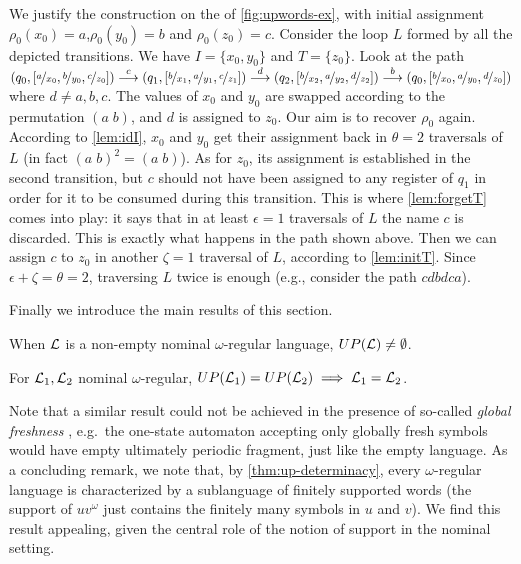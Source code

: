 \begin{example} We justify the construction on the \hdma{} of \cref{fig:upwords-ex}, with initial assignment $\rho_0(x_0) = a$,$\rho_0(y_0) = b$ and $\rho_0(z_0) = c$. Consider the loop $L$ formed by all the depicted transitions. We have $I = \{x_0,y_0\}$ and $T = \{z_0\}$. Look at the path
$	(q_0,[\nicefrac{a}{x_0},\nicefrac{b}{y_0},\nicefrac{c}{z_0}]) \overset{c}{\longrightarrow} (q_1,[\nicefrac{b}{x_1},\nicefrac{a}{y_1},\nicefrac{c}{z_1}]) \overset{d}{\longrightarrow} (q_2,[\nicefrac{b}{x_2},\nicefrac{a}{y_2},\nicefrac{d}{z_2}])
	\overset{b}{\longrightarrow} (q_0,[\nicefrac{b}{x_0},\nicefrac{a}{y_0},\nicefrac{d}{z_0}])$
%
where $d \neq a,b,c$. The values of $x_0$ and $y_0$ are swapped according to the permutation $(a \; b)$, and $d$ is assigned to $z_0$. Our aim is to recover $\rho_0$ again. According to \cref{lem:idI}, $x_0$ and $y_0$ get their assignment back in $\theta = 2$ traversals of $L$ (in fact $(a\; b)^2 = (a\; b)$). As for $z_0$, its assignment is established in the second transition, but $c$ should not have been assigned to any register of $q_1$ in order for it to be consumed during this transition. This is where \cref{lem:forgetT} comes into play: it says that in at least $\epsilon = 1$ traversals of $L$ the name $c$ is discarded. This is exactly what happens in the path shown above. Then we can assign $c$ to $z_0$ in another $\zeta = 1$ traversal of $L$, according to \cref{lem:initT}. Since $\epsilon + \zeta  = \theta = 2$, traversing $L$ twice is enough (e.g., consider the path $cdbdca$).
\end{example}
%
\noindent Finally we introduce the main results of this section.
%
\begin{theorem}
\label{thm:up-fragment}
When $\mathcal{L}$ is a non-empty nominal $\omega$-regular language, $UP(\mathcal{L}) \neq \emptyset$.
\end{theorem}

\begin{theorem}
\label{thm:up-determinacy}
For $\mathcal{L}_1,\mathcal{L}_2$ nominal $\omega$-regular, $UP(\mathcal{L}_1) = UP(\mathcal{L}_2) \implies\mathcal{L}_1 = \mathcal{L}_2$.
\end{theorem}
% 
Note that a similar result could not be achieved in the presence of so-called \emph{global freshness} \cite{Tze11}, e.g.\ the one-state automaton accepting only globally fresh symbols would have empty ultimately periodic fragment, just like the empty language. As a concluding remark, we note that, by \cref{thm:up-determinacy}, every $\omega$-regular language is characterized by a sublanguage of finitely supported words (the support of $uv^\omega$ just contains the finitely many symbols in $u$ and $v$). We find this result appealing, given the central role of the notion of support in the nominal setting. 


